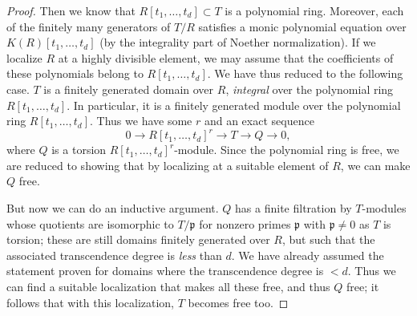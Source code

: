 \begin{proof}
Then we know that $R[t_1, \dots, t_d] \subset T$ is  a polynomial ring.
Moreover, each of the finitely many generators of $T/R$ satisfies a monic polynomial
equation over $K(R)[t_1, \dots, t_d]$ (by the integrality part of Noether
normalization). If we localize $R$ at a highly divisible element, we may
assume that the coefficients of these polynomials belong to $R[t_1, \dots,
t_d]$. 
We have thus reduced to the following case. $T$ is a finitely generated domain
over $R$, \emph{integral} over the polynomial ring $R[t_1, \dots, t_d]$. In
particular, it is a finitely generated module over the polynomial ring $R[t_1,
\dots, t_d]$.
Thus we have some $r$ and an exact sequence
\[ 0 \to R[t_1, \dots, t_d]^r \to T \to Q \to 0,  \]
where $Q$ is a torsion $R[t_1, \dots, t_d]^r$-module. Since the polynomial
ring is free, we are reduced to showing that by localizing at a suitable
element of $R$, we can make  $Q$ free. 

But now we can do an inductive argument. $Q$ has a  finite filtration by
$T$-modules whose
quotients are isomorphic to $T/\mathfrak{p}$ for nonzero primes
$\mathfrak{p}$ with $\mathfrak{p} \neq 0$ as $T$ is torsion; these are still domains finitely generated over $R$, but such
that the associated transcendence degree is \emph{less} than $d$. We have
already assumed the statement proven for domains where the transcendence
degree is $< d$. Thus we can
find a suitable localization that makes all these  free, and thus $Q$ free; it
follows that with this localization, $T$ becomes free too.
\end{proof} 
